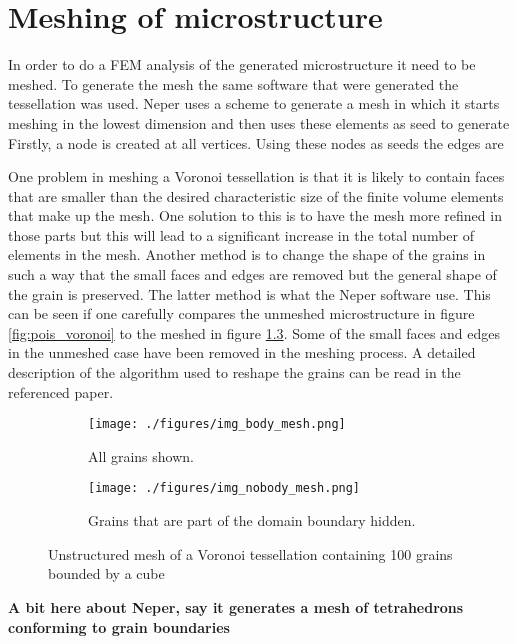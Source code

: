 \documentclass[meshing_micro.tex]{subfiles}
\begin{document}
\chapter{Meshing of microstructure}

In order to do a FEM analysis of the generated microstructure it need to be meshed. To generate the mesh the same software that were generated the tessellation was used. Neper uses a scheme to generate a mesh in which it starts meshing in the lowest dimension and then uses these elements as seed to generate  Firstly, a node is created at all vertices. Using these nodes as seeds the edges are 


One problem in meshing a Voronoi tessellation is that it is likely to contain faces that are smaller than the desired characteristic size of the finite volume elements that make up the mesh. One solution to this is to have the mesh more refined in those    parts but this will lead to a significant increase in the total number of elements in the mesh. Another method is to change the shape of the grains in such a way that the small faces and edges are removed but the general shape of the grain is preserved. The latter method is what the Neper software use. This can be seen if one carefully compares the unmeshed microstructure in figure \ref{fig:pois_voronoi} to the meshed in figure \ref{fig:pois_voronoi_mesh}. Some of the small faces and edges in the unmeshed case have been removed in the meshing process. A detailed description of the algorithm used to reshape the grains can be read in the referenced paper.


 
 \begin{figure}
\centering
\begin{subfigure}[b]{.5\textwidth}
  \centering
  \texttt{[image: ./figures/img\_body\_mesh.png]}
  \caption{All grains shown.}
  \label{fig:pois_voronoi_a_mesh}
\end{subfigure}%
\begin{subfigure}[b]{.5\textwidth}
  \centering
  \texttt{[image: ./figures/img\_nobody\_mesh.png]}
  \caption{Grains that are part of the domain boundary hidden.}
  \label{fig:pois_voronoi_b_mesh}
\end{subfigure}
\caption{Unstructured mesh of a Voronoi tessellation containing 100 grains bounded by a cube}
\label{fig:pois_voronoi_mesh}
\end{figure}


 \textbf{A bit here about Neper, say it generates a mesh of tetrahedrons conforming to grain boundaries }
\end{document}
